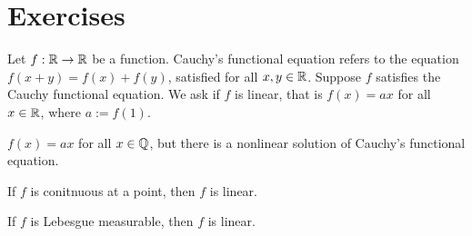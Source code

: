 \documentclass{../../large}
\begin{document}
\begin{prb}
\end{prb}


\section*{Exercises}
\begin{prb}
Let $f:\mathbb{R}\to\mathbb{R}$ be a function.
Cauchy's functional equation refers to the equation $f(x+y)=f(x)+f(y)$, satisfied for all $x,y\in\mathbb{R}$.
Suppose $f$ satisfies the Cauchy functional equation.
We ask if $f$ is linear, that is $f(x)=ax$ for all $x\in\mathbb{R}$, where $a:=f(1)$.
\begin{parts}
\item $f(x)=ax$ for all $x\in\mathbb{Q}$, but there is a nonlinear solution of Cauchy's functional equation.
\item If $f$ is conitnuous at a point, then $f$ is linear.
\item If $f$ is Lebesgue measurable, then $f$ is linear.
\end{parts}
\end{prb}
\end{document}
